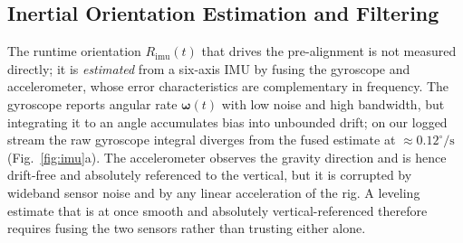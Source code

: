 \documentclass[journal]{IEEEtran}
\begin{document}
\subsection{Inertial Orientation Estimation and Filtering}
\label{sec:ahrs}
The runtime orientation $R_{\mathrm{imu}}(t)$ that drives the pre-alignment is not measured directly; it is \emph{estimated} from a six-axis IMU by fusing the gyroscope and accelerometer, whose error characteristics are complementary in frequency. The gyroscope reports angular rate $\boldsymbol\omega(t)$ with low noise and high bandwidth, but integrating it to an angle accumulates bias into unbounded drift; on our logged stream the raw gyroscope integral diverges from the fused estimate at $\approx 0.12^\circ/\mathrm{s}$ (Fig.~\ref{fig:imu}a). The accelerometer observes the gravity direction and is hence drift-free and absolutely referenced to the vertical, but it is corrupted by wideband sensor noise and by any linear acceleration of the rig. A leveling estimate that is at once smooth and absolutely vertical-referenced therefore requires fusing the two sensors rather than trusting either alone.
\end{document}
